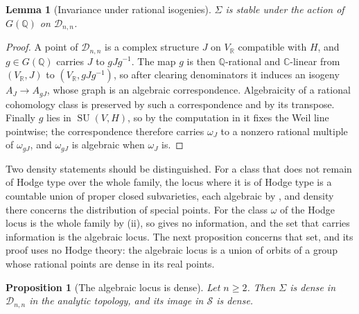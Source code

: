 \documentclass[11pt,reqno]{amsart}
\theoremstyle{plain}
\newtheorem{lemma}[theorem]{Lemma}
\newtheorem{proposition}[theorem]{Proposition}
\theoremstyle{definition}
\theoremstyle{remark}
\newcommand{\QQ}{\mathbb{Q}}
\newcommand{\RR}{\mathbb{R}}
\newcommand{\CC}{\mathbb{C}}
\newcommand{\cD}{\mathcal{D}}
\newcommand{\cS}{\mathcal{S}}
\DeclareMathOperator{\SU}{SU}
\begin{document}
\begin{lemma}[Invariance under rational isogenies]\label{lem:Ginvariance}
$\Sigma$ is stable under the action of $G(\QQ)$ on $\cD_{n,n}$.
\end{lemma}

\begin{proof}
A point of $\cD_{n,n}$ is a complex structure $J$ on $V_{\RR}$ compatible with
$H$, and $g\in G(\QQ)$ carries $J$ to $gJg^{-1}$. The map $g$ is then
$\QQ$-rational and $\CC$-linear from $(V_{\RR},J)$ to $(V_{\RR},gJg^{-1})$, so
after clearing denominators it induces an isogeny $A_{J}\to A_{gJ}$, whose
graph is an algebraic correspondence. Algebraicity of a rational cohomology
class is preserved by such a correspondence and by its transpose. Finally $g$
lies in $\SU(V,H)$, so by the computation in  it fixes
the Weil line pointwise; the correspondence therefore carries $\omega_{J}$ to
a nonzero rational multiple of $\omega_{gJ}$, and $\omega_{gJ}$ is algebraic
when $\omega_{J}$ is.
\end{proof}

Two density statements should be distinguished. For a class that does not
remain of Hodge type over the whole family, the locus where it is of Hodge
type is a countable union of proper closed subvarieties, each algebraic by
, and density there concerns the distribution of special
points. For the class $\omega$ of  the Hodge locus is the
whole family by (ii), so  gives no
information, and the set that carries information is the algebraic locus. The
next proposition concerns that set, and its proof uses no Hodge theory: the
algebraic locus is a union of orbits of a group whose rational points are
dense in its real points.

\begin{proposition}[The algebraic locus is dense]\label{prop:densealg}
Let $n\ge2$. Then $\Sigma$ is dense in $\cD_{n,n}$ in the analytic topology,
and its image in $\cS$ is dense.
\end{proposition}
\end{document}
